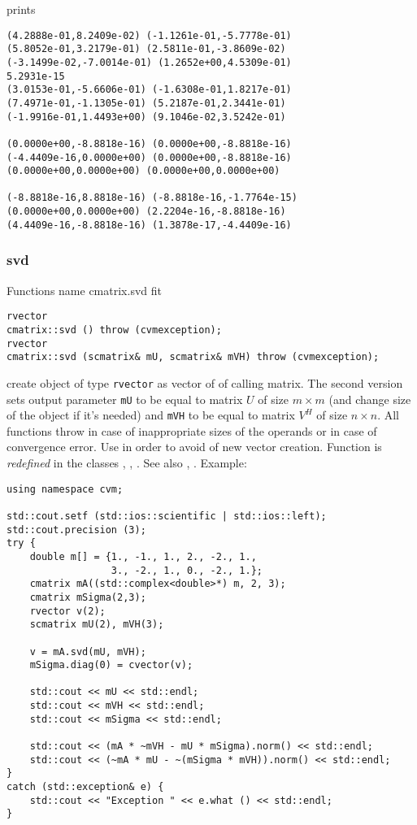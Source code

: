 prints
\begin{Verbatim}
(4.2888e-01,8.2409e-02) (-1.1261e-01,-5.7778e-01)
(5.8052e-01,3.2179e-01) (2.5811e-01,-3.8609e-02)
(-3.1499e-02,-7.0014e-01) (1.2652e+00,4.5309e-01)
5.2931e-15
(3.0153e-01,-5.6606e-01) (-1.6308e-01,1.8217e-01)
(7.4971e-01,-1.1305e-01) (5.2187e-01,2.3441e-01)
(-1.9916e-01,1.4493e+00) (9.1046e-02,3.5242e-01)

(0.0000e+00,-8.8818e-16) (0.0000e+00,-8.8818e-16)
(-4.4409e-16,0.0000e+00) (0.0000e+00,-8.8818e-16)
(0.0000e+00,0.0000e+00) (0.0000e+00,0.0000e+00)

(-8.8818e-16,8.8818e-16) (-8.8818e-16,-1.7764e-15)
(0.0000e+00,0.0000e+00) (2.2204e-16,-8.8818e-16)
(4.4409e-16,-8.8818e-16) (1.3878e-17,-4.4409e-16)
\end{Verbatim}
\newpage


\subsubsection{svd}
Functions%
\pdfdest name {cmatrix.svd} fit
\begin{verbatim}
rvector
cmatrix::svd () throw (cvmexception);
rvector
cmatrix::svd (scmatrix& mU, scmatrix& mVH) throw (cvmexception);
\end{verbatim}
create  object of type \verb"rvector"
as  vector of
 of  calling matrix.
The second version 
sets output parameter \verb"mU" to be equal
to  matrix
$U$ of size $m\times m$ (and change
 size of the object if it's needed) and
\verb"mVH" to be equal
to  matrix $V^H$ of size $n\times n$.
All  functions throw
in case of inappropriate sizes of the operands
or in case of convergence error.
Use  in order to avoid of
 new vector creation.
Function is \emph{redefined} in the  classes
, ,
.
See also
,
.
Example:
\begin{Verbatim}
using namespace cvm;

std::cout.setf (std::ios::scientific | std::ios::left); 
std::cout.precision (3);
try {
    double m[] = {1., -1., 1., 2., -2., 1.,
                  3., -2., 1., 0., -2., 1.};
    cmatrix mA((std::complex<double>*) m, 2, 3);
    cmatrix mSigma(2,3);
    rvector v(2);
    scmatrix mU(2), mVH(3);

    v = mA.svd(mU, mVH);
    mSigma.diag(0) = cvector(v);

    std::cout << mU << std::endl;
    std::cout << mVH << std::endl;
    std::cout << mSigma << std::endl;

    std::cout << (mA * ~mVH - mU * mSigma).norm() << std::endl;
    std::cout << (~mA * mU - ~(mSigma * mVH)).norm() << std::endl;
}
catch (std::exception& e) {
    std::cout << "Exception " << e.what () << std::endl;
}
\end{Verbatim}
